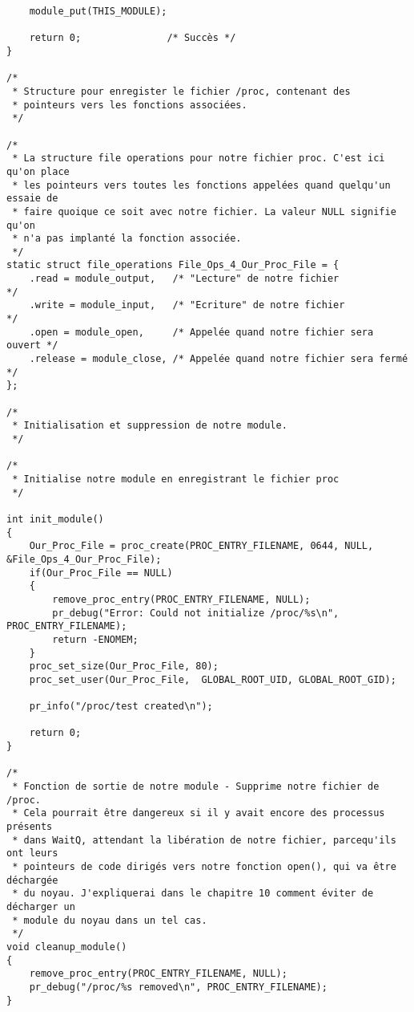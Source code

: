 \documentclass[11pt]{article}
\begin{document}
\begin{verbatim}
    module_put(THIS_MODULE);

    return 0;               /* Succès */
}

/*
 * Structure pour enregister le fichier /proc, contenant des
 * pointeurs vers les fonctions associées.
 */

/*
 * La structure file operations pour notre fichier proc. C'est ici qu'on place
 * les pointeurs vers toutes les fonctions appelées quand quelqu'un essaie de
 * faire quoique ce soit avec notre fichier. La valeur NULL signifie qu'on
 * n'a pas implanté la fonction associée.
 */
static struct file_operations File_Ops_4_Our_Proc_File = {
    .read = module_output,   /* "Lecture" de notre fichier              */
    .write = module_input,   /* "Ecriture" de notre fichier             */
    .open = module_open,     /* Appelée quand notre fichier sera ouvert */
    .release = module_close, /* Appelée quand notre fichier sera fermé  */
};

/*
 * Initialisation et suppression de notre module.
 */

/*
 * Initialise notre module en enregistrant le fichier proc
 */

int init_module()
{
    Our_Proc_File = proc_create(PROC_ENTRY_FILENAME, 0644, NULL, &File_Ops_4_Our_Proc_File);
    if(Our_Proc_File == NULL)
    {
        remove_proc_entry(PROC_ENTRY_FILENAME, NULL);
        pr_debug("Error: Could not initialize /proc/%s\n", PROC_ENTRY_FILENAME);
        return -ENOMEM;
    }
    proc_set_size(Our_Proc_File, 80);
    proc_set_user(Our_Proc_File,  GLOBAL_ROOT_UID, GLOBAL_ROOT_GID);

    pr_info("/proc/test created\n");

    return 0;
}

/*
 * Fonction de sortie de notre module - Supprime notre fichier de /proc.
 * Cela pourrait être dangereux si il y avait encore des processus présents
 * dans WaitQ, attendant la libération de notre fichier, parcequ'ils ont leurs
 * pointeurs de code dirigés vers notre fonction open(), qui va être déchargée
 * du noyau. J'expliquerai dans le chapitre 10 comment éviter de décharger un
 * module du noyau dans un tel cas.
 */
void cleanup_module()
{
    remove_proc_entry(PROC_ENTRY_FILENAME, NULL);
    pr_debug("/proc/%s removed\n", PROC_ENTRY_FILENAME);
}
\end{verbatim}
\end{document}
